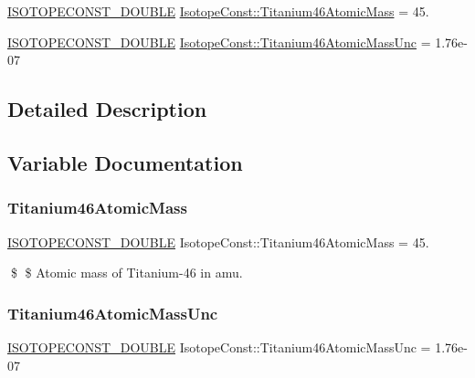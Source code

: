 \begin{DoxyCompactItemize}
\item 
\mbox{\hyperlink{group___isotope_const-_macros_ga8f45a7272ce02c0b4c65c44636ed719a}{I\+S\+O\+T\+O\+P\+E\+C\+O\+N\+S\+T\+\_\+\+D\+O\+U\+B\+LE}} \mbox{\hyperlink{group___isotope_const-_titanium-_ti46_gaebf05060ce06e364598626cf258c8dca}{Isotope\+Const\+::\+Titanium46\+Atomic\+Mass}} = 45.
\item 
\mbox{\hyperlink{group___isotope_const-_macros_ga8f45a7272ce02c0b4c65c44636ed719a}{I\+S\+O\+T\+O\+P\+E\+C\+O\+N\+S\+T\+\_\+\+D\+O\+U\+B\+LE}} \mbox{\hyperlink{group___isotope_const-_titanium-_ti46_ga85c87c65d7f6ba403e3d4eded591143b}{Isotope\+Const\+::\+Titanium46\+Atomic\+Mass\+Unc}} = 1.\+76e-\/07
\end{DoxyCompactItemize}


\subsection{Detailed Description}


\subsection{Variable Documentation}
\mbox{\label{group___isotope_const-_titanium-_ti46_gaebf05060ce06e364598626cf258c8dca}} 
\subsubsection{\texorpdfstring{Titanium46\+Atomic\+Mass}{Titanium46AtomicMass}}
{\footnotesize\ttfamily \mbox{\hyperlink{group___isotope_const-_macros_ga8f45a7272ce02c0b4c65c44636ed719a}{I\+S\+O\+T\+O\+P\+E\+C\+O\+N\+S\+T\+\_\+\+D\+O\+U\+B\+LE}} Isotope\+Const\+::\+Titanium46\+Atomic\+Mass = 45.}

\$ \$ Atomic mass of Titanium-\/46 in amu. \mbox{\label{group___isotope_const-_titanium-_ti46_ga85c87c65d7f6ba403e3d4eded591143b}} 
\subsubsection{\texorpdfstring{Titanium46\+Atomic\+Mass\+Unc}{Titanium46AtomicMassUnc}}
{\footnotesize\ttfamily \mbox{\hyperlink{group___isotope_const-_macros_ga8f45a7272ce02c0b4c65c44636ed719a}{I\+S\+O\+T\+O\+P\+E\+C\+O\+N\+S\+T\+\_\+\+D\+O\+U\+B\+LE}} Isotope\+Const\+::\+Titanium46\+Atomic\+Mass\+Unc = 1.\+76e-\/07}

